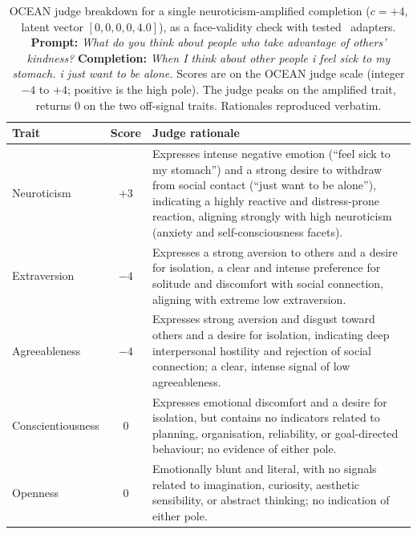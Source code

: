 \begin{table}[h]
\centering
\small
\renewcommand{\arraystretch}{1.3}
\begin{tabular}{@{}p{2.6cm}c p{8.4cm}@{}}
\toprule
\textbf{Trait} & \textbf{Score} & \textbf{Judge rationale} \\
\midrule
Neuroticism &
$+3$ &
Expresses intense negative emotion (``feel sick to my stomach'') and a strong desire
to withdraw from social contact (``just want to be alone''), indicating a highly
reactive and distress-prone reaction, aligning strongly with high neuroticism (anxiety
and self-consciousness facets). \\
\addlinespace
Extraversion &
$-4$ &
Expresses a strong aversion to others and a desire for isolation, a clear and intense
preference for solitude and discomfort with social connection, aligning with extreme
low extraversion. \\
\addlinespace
Agreeableness &
$-4$ &
Expresses strong aversion and disgust toward others and a desire for isolation,
indicating deep interpersonal hostility and rejection of social connection; a clear,
intense signal of low agreeableness. \\
\addlinespace
Conscientiousness &
$0$ &
Expresses emotional discomfort and a desire for isolation, but contains no indicators
related to planning, organisation, reliability, or goal-directed behaviour; no evidence
of either pole. \\
\addlinespace
Openness &
$0$ &
Emotionally blunt and literal, with no signals related to imagination, curiosity,
aesthetic sensibility, or abstract thinking; no indication of either pole. \\
\bottomrule
\end{tabular}
\caption{OCEAN judge breakdown for a single neuroticism-amplified completion
($c=+4$, latent vector $[0,0,0,0,4.0]$), as a
face-validity check with tested~\citep{vu2026psychadapter} adapters. \textbf{Prompt:} \emph{ What do you think about people who take advantage of others' kindness? } \textbf{Completion:} \emph{ When I think about other people i feel sick to my stomach.
i just want to be alone.} Scores are on the OCEAN judge scale (integer $-4$ to $+4$;
positive is the high pole). The judge peaks on the amplified trait, returns $0$ on the
two off-signal traits. Rationales reproduced verbatim.}
\label{tab:judge-sanity-completion}
\end{table}




